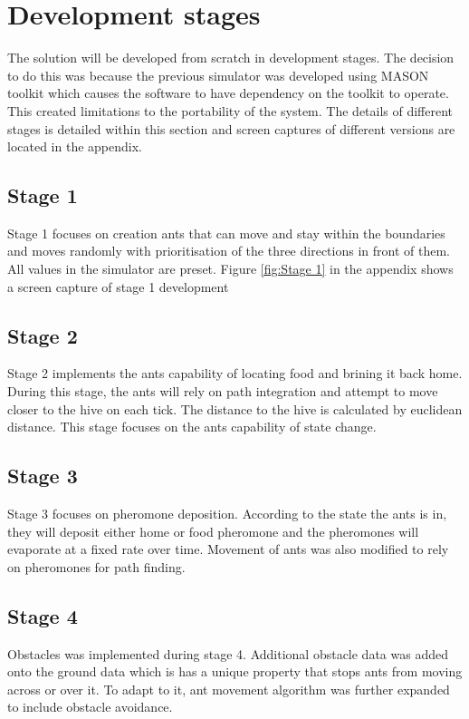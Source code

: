 \documentclass[a4paper, oneside, 11pt]{report}
\begin{document}
\section{Development stages}
The solution will be developed from scratch in development stages. The decision to do this was because the previous simulator was developed using MASON toolkit which causes the software to have dependency on the toolkit to operate. This created limitations to the portability of the system. The details of different stages is detailed within this section and screen captures of different versions are located in the appendix.

\subsection{Stage 1}
Stage 1 focuses on creation ants that can move and stay within the boundaries and moves randomly with prioritisation of the three directions in front of them. All values in the simulator are preset. Figure \ref{fig:Stage 1} in the appendix shows a screen capture of stage 1 development

\subsection{Stage 2}
Stage 2 implements the ants capability of locating food and brining it back home. During this stage, the ants will rely on path integration and attempt to move closer to the hive on each tick. The distance to the hive is calculated by euclidean distance. This stage focuses on the ants capability of state change.

\subsection{Stage 3}
Stage 3 focuses on pheromone deposition. According to the state the ants is in, they will deposit either home or food pheromone and the pheromones will evaporate at a fixed rate over time. Movement of ants was also modified to rely on pheromones for path finding.

\subsection{Stage 4}
Obstacles was implemented during stage 4. Additional obstacle data was added onto the ground data which is has a unique property that stops ants from moving across or over it. To adapt to it, ant movement algorithm was further expanded to include obstacle avoidance.
\end{document}
